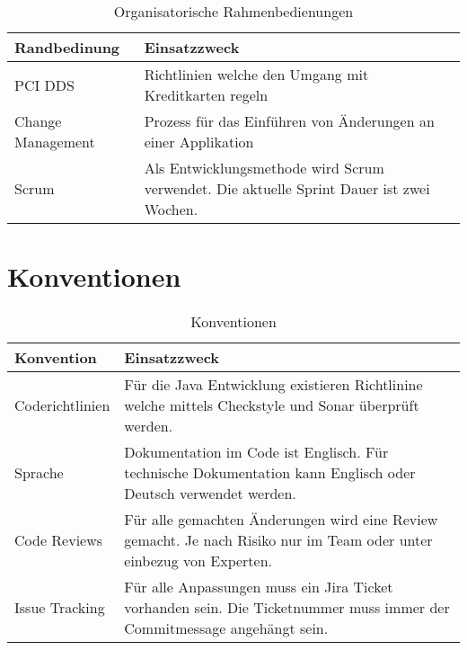 \begin{table}[H]
	\centering
	\caption{Organisatorische Rahmenbedienungen}
	\begin{tabular}{ | p{4cm} | p{12cm} | }
		\toprule
		{\textbf{Randbedinung}} & {\textbf{Einsatzzweck}} \\
		\midrule
		PCI DDS & Richtlinien welche den Umgang mit Kreditkarten regeln \\ \hline
		Change Management & Prozess für das Einführen von Änderungen an einer Applikation\\ \hline
		Scrum & Als Entwicklungsmethode wird Scrum verwendet. Die aktuelle Sprint Dauer ist zwei Wochen.\\ 
		\bottomrule
	\end{tabular}
\end{table}

\section{Konventionen}

\begin{table}[H]
	\centering
	\caption{Konventionen}
	\begin{tabular}{ | p{4cm} | p{12cm} | }
		\toprule
		{\textbf{Konvention}} & {\textbf{Einsatzzweck}} \\
		\midrule
		Coderichtlinien & Für die Java Entwicklung existieren Richtlinine welche mittels Checkstyle und Sonar überprüft werden. \\ \hline
		Sprache & Dokumentation im Code ist Englisch. Für technische Dokumentation kann Englisch oder Deutsch verwendet werden.\\ \hline
		Code Reviews & Für alle gemachten Änderungen wird eine Review gemacht. Je nach Risiko nur im Team oder unter einbezug von Experten.\\ \hline
		Issue Tracking & Für alle Anpassungen muss ein Jira Ticket vorhanden sein. Die Ticketnummer muss immer der Commitmessage angehängt sein.\\	
		\bottomrule
	\end{tabular}
\end{table}
